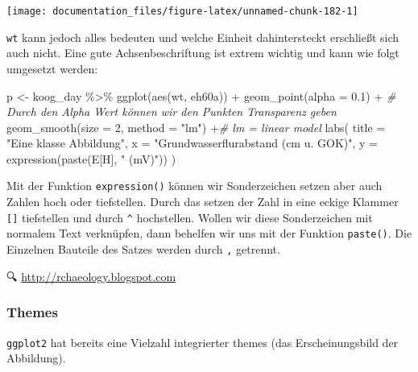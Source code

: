 \documentclass[
]{article}
\newenvironment{Shaded}{\begin{snugshade}}{\end{snugshade}}
\newcommand{\AttributeTok}[1]{\textcolor[rgb]{0.77,0.63,0.00}{#1}}
\newcommand{\CommentTok}[1]{\textcolor[rgb]{0.56,0.35,0.01}{\textit{#1}}}
\newcommand{\DecValTok}[1]{\textcolor[rgb]{0.00,0.00,0.81}{#1}}
\newcommand{\FloatTok}[1]{\textcolor[rgb]{0.00,0.00,0.81}{#1}}
\newcommand{\FunctionTok}[1]{\textcolor[rgb]{0.00,0.00,0.00}{#1}}
\newcommand{\NormalTok}[1]{#1}
\newcommand{\OtherTok}[1]{\textcolor[rgb]{0.56,0.35,0.01}{#1}}
\newcommand{\SpecialCharTok}[1]{\textcolor[rgb]{0.00,0.00,0.00}{#1}}
\newcommand{\StringTok}[1]{\textcolor[rgb]{0.31,0.60,0.02}{#1}}
\begin{document}
\begin{center}\texttt{[image: documentation\_files/figure-latex/unnamed-chunk-182-1]} \end{center}

\texttt{wt} kann jedoch alles bedeuten und welche Einheit dahintersteckt erschließt sich auch nicht. Eine gute Achsenbeschriftung ist extrem wichtig und kann wie folgt umgesetzt werden:

\begin{Shaded}
\begin{Highlighting}[]
\NormalTok{p }\OtherTok{\textless{}{-}}\NormalTok{ koog\_day  }\SpecialCharTok{\%\textgreater{}\%}
  \FunctionTok{ggplot}\NormalTok{(}\FunctionTok{aes}\NormalTok{(wt, eh60a)) }\SpecialCharTok{+}
  \FunctionTok{geom\_point}\NormalTok{(}\AttributeTok{alpha =} \FloatTok{0.1}\NormalTok{) }\SpecialCharTok{+} \CommentTok{\# Durch den Alpha Wert können wir den Punkten Transparenz geben}
  \FunctionTok{geom\_smooth}\NormalTok{(}\AttributeTok{size =} \DecValTok{2}\NormalTok{, }\AttributeTok{method =} \StringTok{"lm"}\NormalTok{) }\SpecialCharTok{+}\CommentTok{\# lm = linear model}
  \FunctionTok{labs}\NormalTok{(}
    \AttributeTok{title =} \StringTok{"Eine klasse Abbildung"}\NormalTok{,}
    \AttributeTok{x =} \StringTok{"Grundwasserflurabstand (cm u. GOK)"}\NormalTok{, }
    \AttributeTok{y =} \FunctionTok{expression}\NormalTok{(}\FunctionTok{paste}\NormalTok{(E[H], }\StringTok{" (mV)"}\NormalTok{))}
\NormalTok{  )}
\end{Highlighting}
\end{Shaded}

Mit der Funktion \texttt{expression()} können wir Sonderzeichen setzen aber auch Zahlen hoch oder tiefstellen. Durch das setzen der Zahl in eine eckige Klammer \texttt{{[}{]}} tiefstellen und durch \texttt{\^{}} hochstellen. Wollen wir diese Sonderzeichen mit normalem Text verknüpfen, dann behelfen wir uns mit der Funktion \texttt{paste()}. Die Einzelnen Bauteile des Satzes werden durch \texttt{,} getrennt.

🔍 \href{http://rchaeology.blogspot.com/2012/11/combining-superscripts-subscripts-and.html}{http://rchaeology.blogspot.com}

\hypertarget{themes}{%
\subsubsection{Themes}\label{themes}}

\texttt{ggplot2} hat bereits eine Vielzahl integrierter themes (das Erscheinungsbild der Abbildung).
\end{document}
